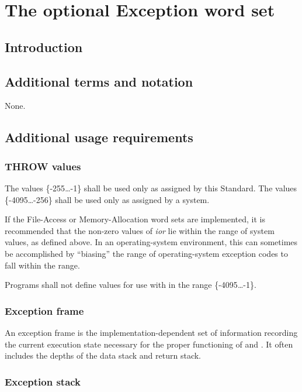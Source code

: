 \chapter{The optional Exception word set} %

\section{Introduction} %

\section{Additional terms and notation} %
None.

\section{Additional usage requirements} %

\subsection{THROW values} %
\label{exception:throw}

The  values \{-255{\ldots}-1\} shall be used only as
assigned by this Standard. The values \{-4095{\ldots}-256\}
shall be used only as assigned by a system.

If the File-Access or Memory-Allocation word sets are implemented,
it is recommended that the non-zero values of \emph{ior} lie within
the range of system  values, as defined above. In an
operating-system environment, this can sometimes be accomplished
by ``biasing'' the range of operating-system exception codes to fall
within the  range.

Programs shall not define values for use with  in the
range \{-4095{\ldots}-1\}.

\subsection{Exception frame} %

An exception frame is the implementation-dependent set of
information recording the current execution state necessary for
the proper functioning of  and . It often
includes the depths of the data stack and return stack.

\subsection{Exception stack} %

